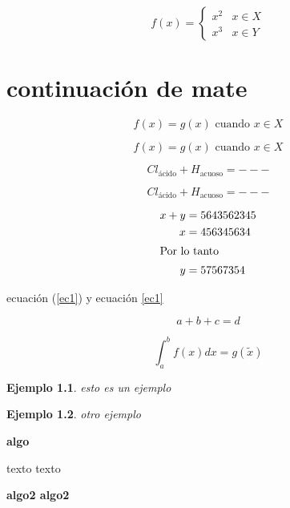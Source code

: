 \documentclass{report}
\newenvironment{impo}{\begin{center}		\sffamily\bfseries\color{blue}}{\end{center}}
\numberwithin{equation}{section}
\newtheorem{eje}{Ejemplo}
\theoremstyle{definition}
\theoremstyle{remark}
\begin{document}
\begin{equation}
f(x)=\begin{cases}
x^2 & x\in X \\
x^3 & x\in Y
\end{cases}
\end{equation}

\chapter{continuación de mate}

$$
f(x)=g(x)\mbox{ cuando }x\in X
$$

$$
f(x)=g(x)\text{ cuando }x\in X
$$

$$
Cl_{\mbox{ácido}}+ H_{\mbox{acuoso}}=--- 
$$

$$
Cl_{\text{ácido}}+ H_{\text{acuoso}}=--- 
$$

\begin{align}
x+y&=5643562345 \\
x&=456345634 \\
\intertext{Por lo tanto}
y&=57567354
\end{align}

ecuación (\ref{ec1})  y ecuación \eqref{ec1}







\newpage	
	
\begin{equation}
a+b+c=d
\end{equation}
	
$$
\int_a^b f(x)dx = g(\tilde{x})
$$
	
\begin{eje}
	esto es un ejemplo
\end{eje}

\begin{eje}
	otro ejemplo
\end{eje}
	
	
	
	
	
	
	
	
\begin{center}
	\sffamily\bfseries\color{blue} algo
\end{center}

texto texto	

\begin{impo}
	algo2 algo2
\end{impo}

\cite{*}


	
	
\end{document}
